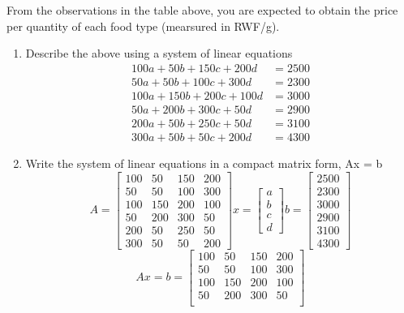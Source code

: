 \documentclass[11pt]{article}
\begin{document}
\begin{enumerate}
From the observations in the table above, you are expected to obtain the price per quantity of each food
type (mearsured in RWF/g).

\begin{enumerate}
\item Describe the above using a system of linear equations
\[
    \begin{aligned}
        100a + 50b + 150c + 200d &= 2500 \\
        50a + 50b + 100c + 300d &= 2300 \\
        100a + 150b + 200c + 100d &= 3000 \\
        50a + 200b + 300c + 50d &= 2900 \\
        200a + 50b + 250c + 50d &= 3100 \\
        300a + 50b + 50c + 200d &= 4300
    \end{aligned}
\]
\item Write the system of linear equations in a compact matrix form, Ax = b
\[
    A = \begin{bmatrix}
        100 & 50 & 150 & 200 \\
        50 & 50 & 100 & 300 \\
        100 & 150 & 200 & 100 \\
        50 & 200 & 300 & 50 \\
        200 & 50 & 250 & 50 \\
        300 & 50 & 50 & 200
    \end{bmatrix}
    x = \begin{bmatrix}
        a \\
        b \\
        c \\
        d
    \end{bmatrix}
    b = \begin{bmatrix}
        2500 \\
        2300 \\
        3000 \\
        2900 \\
        3100 \\
        4300
    \end{bmatrix}
\]
\[
    Ax = b = \begin{bmatrix}
        100 & 50 & 150 & 200 \\
        50 & 50 & 100 & 300 \\
        100 & 150 & 200 & 100 \\
        50 & 200 & 300 & 50 \\

\end{bmatrix}\]
\end{enumerate}
\end{enumerate}
\end{document}

